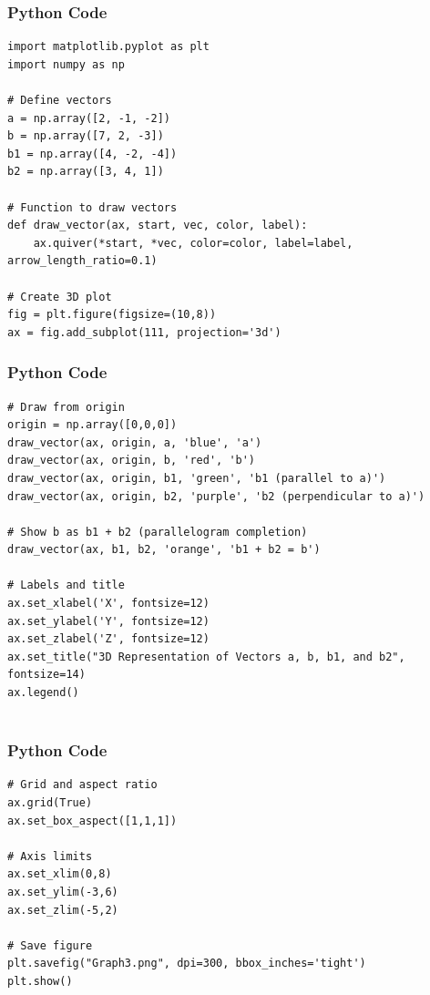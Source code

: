 \documentclass{beamer}
\begin{document}
\begin{frame}[fragile]
    \frametitle{Python Code}
    \begin{lstlisting}
import matplotlib.pyplot as plt
import numpy as np

# Define vectors
a = np.array([2, -1, -2])
b = np.array([7, 2, -3])
b1 = np.array([4, -2, -4])
b2 = np.array([3, 4, 1])

# Function to draw vectors
def draw_vector(ax, start, vec, color, label):
    ax.quiver(*start, *vec, color=color, label=label, arrow_length_ratio=0.1)

# Create 3D plot
fig = plt.figure(figsize=(10,8))
ax = fig.add_subplot(111, projection='3d')
\end{lstlisting}
\end{frame}

\begin{frame}[fragile]
    \frametitle{Python Code}

    \begin{lstlisting}
# Draw from origin
origin = np.array([0,0,0])
draw_vector(ax, origin, a, 'blue', 'a')
draw_vector(ax, origin, b, 'red', 'b')
draw_vector(ax, origin, b1, 'green', 'b1 (parallel to a)')
draw_vector(ax, origin, b2, 'purple', 'b2 (perpendicular to a)')

# Show b as b1 + b2 (parallelogram completion)
draw_vector(ax, b1, b2, 'orange', 'b1 + b2 = b')

# Labels and title
ax.set_xlabel('X', fontsize=12)
ax.set_ylabel('Y', fontsize=12)
ax.set_zlabel('Z', fontsize=12)
ax.set_title("3D Representation of Vectors a, b, b1, and b2", fontsize=14)
ax.legend()


    \end{lstlisting}
\end{frame}

\begin{frame}[fragile]
    \frametitle{Python Code}

    \begin{lstlisting}
# Grid and aspect ratio
ax.grid(True)
ax.set_box_aspect([1,1,1])

# Axis limits
ax.set_xlim(0,8)
ax.set_ylim(-3,6)
ax.set_zlim(-5,2)

# Save figure
plt.savefig("Graph3.png", dpi=300, bbox_inches='tight')
plt.show()



  \end{lstlisting}
\end{frame}
\end{document}
